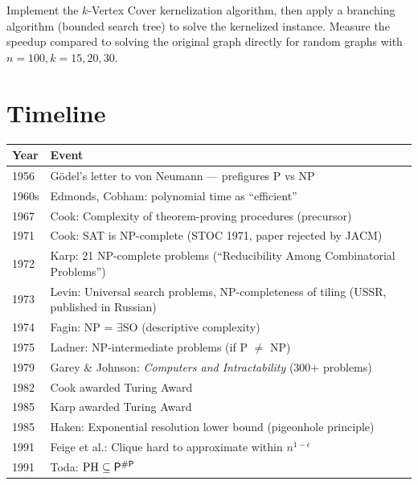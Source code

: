 \begin{exercise}[Computational]
Implement the $k$-Vertex Cover kernelization algorithm, then apply a branching algorithm (bounded search tree) to solve the kernelized instance. Measure the speedup compared to solving the original graph directly for random graphs with $n=100, k=15,20,30$.
\end{exercise}

\section{Timeline}
\label{sec:np:timeline}

\begin{tabularx}{\linewidth}{|l|X|}
\hline
\textbf{Year} & \textbf{Event} \\ \hline
1956 & G\"odel's letter to von Neumann — prefigures P vs NP \\ \hline
1960s & Edmonds, Cobham: polynomial time as ``efficient'' \\ \hline
1967 & Cook: Complexity of theorem-proving procedures (precursor) \\ \hline
1971 & Cook: SAT is NP-complete (STOC 1971, paper rejected by JACM) \\ \hline
1972 & Karp: 21 NP-complete problems (``Reducibility Among Combinatorial Problems'') \\ \hline
1973 & Levin: Universal search problems, NP-completeness of tiling (USSR, published in Russian) \\ \hline
1974 & Fagin: NP = $\exists$SO (descriptive complexity) \\ \hline
1975 & Ladner: NP-intermediate problems (if P $\neq$ NP) \\ \hline
1979 & Garey \& Johnson: \emph{Computers and Intractability} (300+ problems) \\ \hline
1982 & Cook awarded Turing Award \\ \hline
1985 & Karp awarded Turing Award \\ \hline
1985 & Haken: Exponential resolution lower bound (pigeonhole principle) \\ \hline
1991 & Feige et al.: Clique hard to approximate within $n^{1-\epsilon}$ \\ \hline
1991 & Toda: $\text{PH} \subseteq \mathsf{P}^{\#\mathsf{P}}$ \\ \hline

\end{tabularx}

